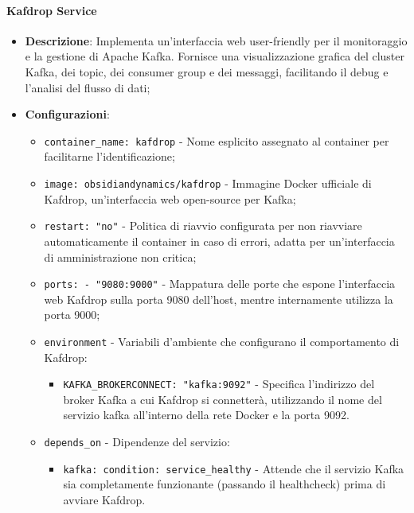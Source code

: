 \documentclass[10pt]{article}
\begin{document}
        \paragraph{Kafdrop Service}
        \begin{itemize} 
        \item \textbf{Descrizione}: Implementa un'interfaccia web user-friendly per il monitoraggio e la gestione di Apache Kafka. Fornisce una visualizzazione grafica del cluster Kafka, dei topic, dei consumer group e dei messaggi, facilitando il debug e l'analisi del flusso di dati;
        \item \textbf{Configurazioni}:
        \begin{itemize}
            \item \texttt{container\_name: kafdrop} - Nome esplicito assegnato al container per facilitarne l'identificazione;
            \item \texttt{image: obsidiandynamics/kafdrop} - Immagine Docker ufficiale di Kafdrop, un'interfaccia web open-source per Kafka;
            \item \texttt{restart: "no"} - Politica di riavvio configurata per non riavviare automaticamente il container in caso di errori, adatta per un'interfaccia di amministrazione non critica;
            \item \texttt{ports: - "9080:9000"} - Mappatura delle porte che espone l'interfaccia web Kafdrop sulla porta 9080 dell'host, mentre internamente utilizza la porta 9000;
            \item \texttt{environment} - Variabili d'ambiente che configurano il comportamento di Kafdrop:
            \begin{itemize}
                \item \texttt{KAFKA\_BROKERCONNECT: "kafka:9092"} - Specifica l'indirizzo del broker Kafka a cui Kafdrop si connetterà, utilizzando il nome del servizio kafka all'interno della rete Docker e la porta 9092.
            \end{itemize}
            \item \texttt{depends\_on} - Dipendenze del servizio:
            \begin{itemize}
                \item \texttt{kafka: condition: service\_healthy} - Attende che il servizio Kafka sia completamente funzionante (passando il healthcheck) prima di avviare Kafdrop.
            \end{itemize}
        \end{itemize}
        

\end{itemize}
\end{document}
